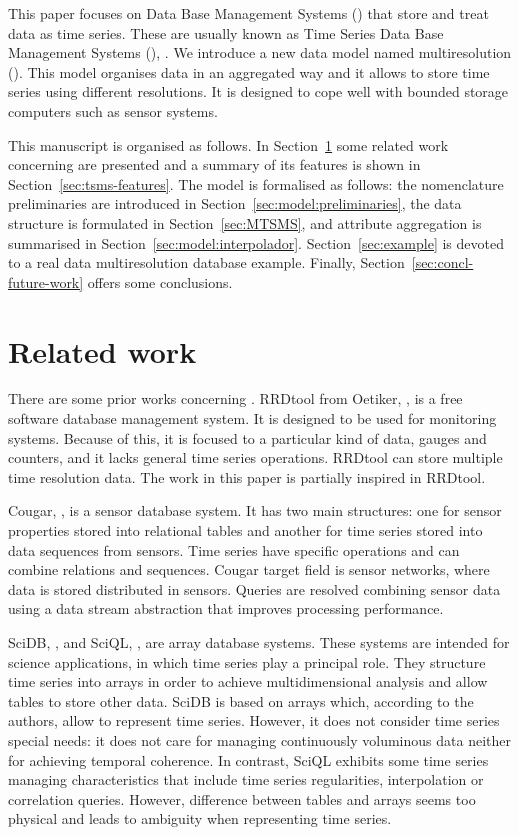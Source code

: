 
This paper focuses on Data Base Management Systems () that
store and treat data as time series. These are usually known as Time
Series Data Base Management Systems (), \cite{dreyer94}.
We introduce a new data model named multiresolution 
(). This model organises data in an aggregated way and it
allows to store time series using different resolutions. It is
designed to cope well with bounded storage computers such as sensor
systems.

This manuscript is organised as follows.  In
Section~\ref{sec:related-work} some related work concerning
 are presented and a summary of its features is shown in
Section~\ref{sec:tsms-features}.  The  model is formalised
as follows: the nomenclature preliminaries are introduced in
Section~\ref{sec:model:preliminaries}, the data structure is
formulated in Section~\ref{sec:MTSMS}, and attribute aggregation is
summarised in
Section~\ref{sec:model:interpolador}. Section~\ref{sec:example} is
devoted to a real data multiresolution database example. Finally,
Section~\ref{sec:concl-future-work} offers some conclusions.


\section{Related work}
\label{sec:related-work}

There are some prior works concerning .
%
RRDtool from Oetiker, \cite{rrdtool}, is a free software database
management system. It is designed to be used for monitoring
systems. Because of this, it is focused to a particular kind of data,
gauges and counters, and it lacks general time series
operations. RRDtool can store multiple time resolution data. The work
in this paper is partially inspired in RRDtool.

Cougar, \cite{bonnet01}, is a sensor database system. It has two main
structures: one for sensor properties stored into relational tables
and another for time series stored into data sequences from
sensors. Time series have specific operations and can combine
relations and sequences. Cougar target field is sensor networks, where
data is stored distributed in sensors. Queries are resolved combining
sensor data using a data stream abstraction that improves processing
performance.

SciDB, \cite{stonebraker09:scidb}, and SciQL, \cite{zhang11}, are
array database systems. These systems are intended for science
applications, in which time series play a principal role. They
structure time series into arrays in order to achieve multidimensional
analysis and allow tables to store other data.  SciDB is based on
arrays which, according to the authors, allow to represent time
series. However, it does not consider time series special needs: it
does not care for managing continuously voluminous data neither for
achieving temporal coherence.  In contrast, SciQL exhibits some time
series managing characteristics that include time series regularities,
interpolation or correlation queries.  However, difference between
tables and arrays seems too physical and leads to ambiguity when
representing time series.

